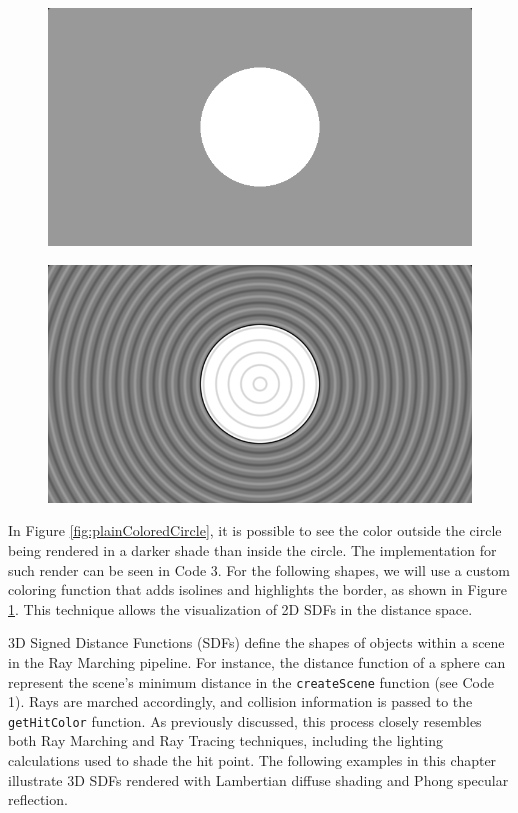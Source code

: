 \begin{figure}
\centering
\begin{minipage}{.5\textwidth}
  \centering
  \includegraphics[width=.8\linewidth]{imagens/circle-plainColor.png}
  \label{fig:plainColoredCircle}
\end{minipage}%
\begin{minipage}{.5\textwidth}
  \centering
  \includegraphics[width=.8\linewidth]{imagens/circle-customColor.png}
  \label{fig:customColoredCircle}
\end{minipage}
\end{figure}

In Figure \ref{fig:plainColoredCircle}, it is possible to see the color outside the circle being rendered in a darker shade than inside the circle. The implementation for such render can be seen in Code 3. For the following shapes, we will use a custom coloring function that adds isolines and highlights the border, as shown in Figure \ref{fig:customColoredCircle}. This technique allows the visualization of 2D SDFs in the distance space.

3D Signed Distance Functions (SDFs) define the shapes of objects within a scene in the Ray Marching pipeline. For instance, the distance function of a sphere can represent the scene's minimum distance in the \texttt{createScene} function (see Code 1). Rays are marched accordingly, and collision information is passed to the \texttt{getHitColor} function. As previously discussed, this process closely resembles both Ray Marching and Ray Tracing techniques, including the lighting calculations used to shade the hit point. The following examples in this chapter illustrate 3D SDFs rendered with Lambertian diffuse shading and Phong specular reflection.


